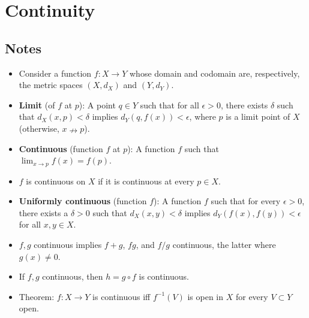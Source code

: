 \documentclass[../../notes.tex]{subfiles}
\begin{document}
\chapter{Continuity}
\section{Notes}
\begin{itemize}
    \item {}Consider a function $f:X\to Y$ whose domain and codomain are, respectively, the metric spaces $(X,d_X)$ and $(Y,d_Y)$.
    \item \textbf{Limit} (of $f$ at $p$): A point $q\in Y$ such that for all $\epsilon>0$, there exists $\delta$ such that $d_X(x,p)<\delta$ implies $d_Y(q,f(x))<\epsilon$, where $p$ is a limit point of $X$ (otherwise, $x\nrightarrow p$).
    \item \textbf{Continuous} (function $f$ at $p$): A function $f$ such that $\lim_{x\to p}f(x)=f(p)$.
    \item $f$ is continuous on $X$ if it is continuous at every $p\in X$.
    \item \textbf{Uniformly continuous} (function $f$): A function $f$ such that for every $\epsilon>0$, there exists a $\delta>0$ such that $d_X(x,y)<\delta$ implies $d_Y(f(x),f(y))<\epsilon$ for all $x,y\in X$.
    \item {}$f,g$ continuous implies $f+g$, $fg$, and $f/g$ continuous, the latter where $g(x)\neq 0$.
    \item If $f,g$ continuous, then $h=g\circ f$ is continuous.
    \item Theorem: $f:X\to Y$ is continuous iff $f^{-1}(V)$ is open in $X$ for every $V\subset Y$ open.
    \begin{figure}[h!]
        \centering
\end{figure}
\end{itemize}
\end{document}

